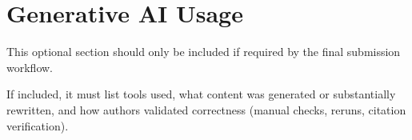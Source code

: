 \section{Generative AI Usage}
This optional section should only be included if required by the final submission workflow.

If included, it must list tools used, what content was generated or substantially rewritten, and how authors validated correctness (manual checks, reruns, citation verification).
